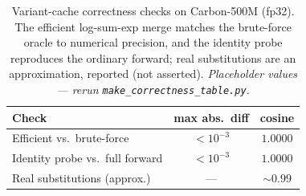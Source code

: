 \begin{table}[t]
  \centering
  \caption{Variant-cache correctness checks on Carbon-500M (fp32). The efficient
  log-sum-exp merge matches the brute-force oracle to numerical precision, and
  the identity probe reproduces the ordinary forward; real substitutions are an
  approximation, reported (not asserted). \emph{Placeholder values --- rerun
  \texttt{make\_correctness\_table.py}.}}
  \label{tab:correctness}
  \begin{tabular}{lcc}
    \toprule
    Check & max abs.\ diff & cosine \\
    \midrule
    Efficient vs.\ brute-force        & $<10^{-3}$ & $1.0000$ \\
    Identity probe vs.\ full forward  & $<10^{-3}$ & $1.0000$ \\
    Real substitutions (approx.)      & ---        & $\sim 0.99$ \\
    \bottomrule
  \end{tabular}
\end{table}
